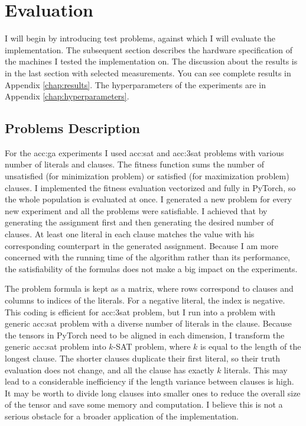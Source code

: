 \chapter{Evaluation}
\label{chap:eval}

I will begin by introducing test problems, against which I will evaluate the implementation. The subsequent section describes the hardware specification of the machines I tested the implementation on. The discussion about the results is in the last section with selected measurements. You can see complete results in Appendix \ref{chap:results}. The hyperparameters of the experiments are in Appendix \ref{chap:hyperparameters}.




\section{Problems Description}
\label{chap:problems}

For the \acrlong{acc:ga} experiments I used \acrshort{acc:sat} and \acrshort{acc:3sat} problems with various number of literals and clauses. The fitness function sums the number of unsatisfied (for minimization problem) or satisfied (for maximization problem) clauses. I implemented the fitness evaluation vectorized and fully in PyTorch, so the whole population is evaluated at once. I generated a new problem for every new experiment and all the problems were satisfiable. I achieved that by generating the assignment first and then generating the desired number of clauses. At least one literal in each clause matches the value with his corresponding counterpart in the generated assignment. Because I am more concerned with the running time of the algorithm rather than its performance, the satisfiability of the formulas does not make a big impact on the experiments.

The problem formula is kept as a matrix, where rows correspond to clauses and columns to indices of the literals. For a negative literal, the index is negative. This coding is efficient for \acrshort{acc:3sat} problem, but I run into a problem with generic \acrshort{acc:sat} problem with a diverse number of literals in the clause. Because the tensors in PyTorch need to be aligned in each dimension, I transform the generic \acrshort{acc:sat} problem into $k$-SAT problem, where $k$ is equal to the length of the longest clause. The shorter clauses duplicate their first literal, so their truth evaluation does not change, and all the clause has exactly $k$ literals. This may lead to a considerable inefficiency if the length variance between clauses is high. It may be worth to divide long clauses into smaller ones to reduce the overall size of the tensor and save some memory and computation. I believe this is not a serious obstacle for a broader application of the implementation.

